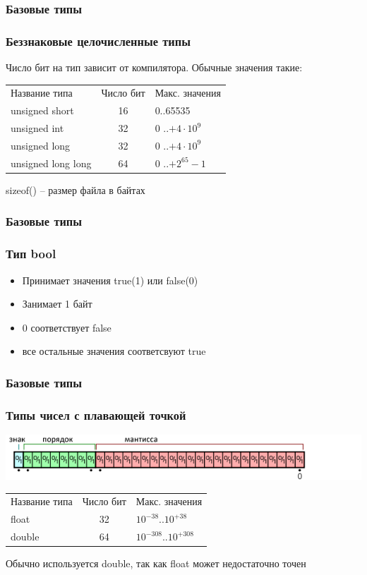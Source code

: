\documentclass[14pt,pdf,hyperref={unicode}]{beamer}
\begin{document}
\begin{frame}
\frametitle{Базовые типы}
\frametitle{Беззнаковые целочисленные типы} 
Число бит на тип зависит от компилятора. Обычные значения такие:
\begin{center}
\begin{tabular}{ l c l }
  Название типа & Число бит & Макс. значения \\
  unsigned short & 16 & 0..65535 \\
  unsigned int & 32 & $0$ ..$+4 \cdot 10^9$ \\
  unsigned long & 32& $0$ ..$+4 \cdot 10^9$ \\
  unsigned long long & 64 & $0$ ..$+2^{65}-1$ \\
\end{tabular}
\end{center}
sizeof() -- размер файла в байтах
\end{frame}

\begin{frame}
\frametitle{Базовые типы}
\frametitle{Тип bool} 
\begin{itemize}

\item Принимает значения true(1) или false(0) \\
\item Занимает 1 байт\\
\item 0 соответствует false\\
\item все остальные значения соответсвуют true

\end{itemize}
\end{frame}

\begin{frame}
\frametitle{Базовые типы}
\frametitle{Типы чисел с плавающей точкой} 
\includegraphics[scale=0.6]{floats.png}
\begin{center}
\begin{tabular}{ l c l }
  Название типа & Число бит & Макс. значения \\
  float & 32 & $10^{-38}$..$10^{+38}$ \\
  double & 64 & $10^{-308}$..$10^{+308}$ \\
\end{tabular}
\end{center}
Обычно используется double, так как float может недостаточно точен
\end{frame}
\end{document}
